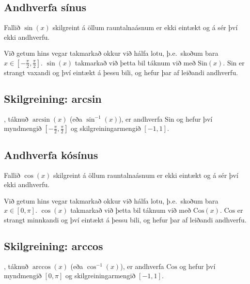 \documentclass[a4paper,10pt,icelandic]{sphinxmanual}
\begin{document}
\subsection{Andhverfa sínus}
\label{\detokenize{kafli04:andhverfa-sinus}}
Fallið \(\sin(x)\) skilgreint á öllum rauntalnaásnum er ekki eintækt
og á sér því ekki andhverfu.

Við getum hins vegar takmarkað okkur við hálfa lotu, þ.e. skoðum bara
\(x\in [-\frac \pi 2, \frac \pi 2]\). \(\sin(x)\) takmarkað við
þetta bil táknum við með \({{\text{Sin}}}(x)\).
\({{\text{Sin}}}\) er strangt vaxandi og því eintækt á þessu bili,
og hefur þar af leiðandi andhverfu.


\subsection{Skilgreining: arcsin}
\label{\detokenize{kafli04:skilgreining-arcsin}}
, táknuð \(\arcsin(x)\) (eða
\(\sin^{-1}(x)\)), er andhverfa \({{\text{Sin}}}\) og hefur því
myndmengið \([-\frac \pi 2,
\frac \pi 2]\) og skilgreiningarmengið \([-1,1]\).



\subsection{Andhverfa kósínus}
\label{\detokenize{kafli04:andhverfa-kosinus}}
Fallið \(\cos(x)\) skilgreint á öllum rauntalnaásnum er ekki eintækt
og á sér því ekki andhverfu.

Við getum hins vegar takmarkað okkur við hálfa lotu, þ.e. skoðum bara
\(x\in [0, \pi]\). \(\cos(x)\) takmarkað við þetta bil táknum
við með \({{\text{Cos}}}(x)\). \({{\text{Cos}}}\) er strangt
minnkandi og því eintækt á þessu bili, og hefur þar af leiðandi
andhverfu.


\subsection{Skilgreining: arccos}
\label{\detokenize{kafli04:skilgreining-arccos}}
, táknuð \(\arccos(x)\) (eða
\(\cos^{-1}(x)\)), er andhverfa \({{\text{Cos}}}\) og hefur því
myndmengið \([0,\pi]\) og skilgreiningarmengið \([-1,1]\).

\end{document}
